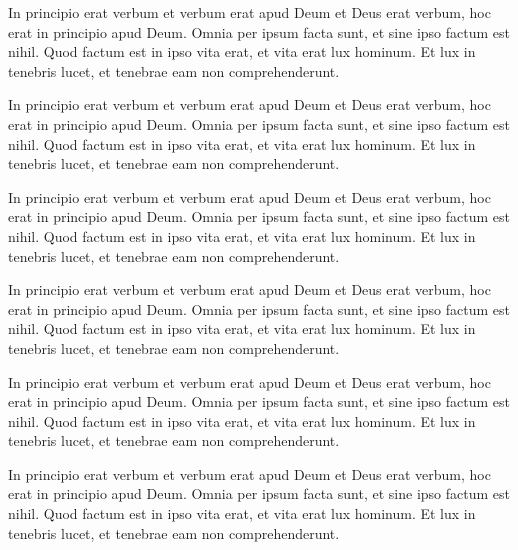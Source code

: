 \documentclass{scrbook}
\begin{document}
\begin{pages}
\begin{Leftside}
\beginnumbering
\pstart
In principio erat verbum et verbum erat apud Deum et Deus erat verbum, hoc erat in principio apud Deum. Omnia per ipsum facta sunt, et sine ipso factum est nihil. Quod factum est in ipso vita erat, et vita erat lux hominum. Et lux in tenebris lucet, et tenebrae eam non comprehenderunt.
\pend

\pstart[\vskip \baselineskip{\hfill ***\hfill\strut}\vskip \baselineskip]
In principio erat verbum et verbum erat apud Deum et Deus erat verbum, hoc erat in principio apud Deum. Omnia per ipsum facta sunt, et sine ipso factum est nihil. Quod factum est in ipso vita erat, et vita erat lux hominum. Et lux in tenebris lucet, et tenebrae eam non comprehenderunt.
\pend

\pstart
In principio erat verbum et verbum erat apud Deum et Deus erat verbum, hoc erat in principio apud Deum. Omnia per ipsum facta sunt, et sine ipso factum est nihil. Quod factum est in ipso vita erat, et vita erat lux hominum. Et lux in tenebris lucet, et tenebrae eam non comprehenderunt.
\pend
\endnumbering
\end{Leftside}
\begin{Rightside}
\beginnumbering
\pstart
In principio erat verbum et verbum erat apud Deum et Deus erat verbum, hoc erat in principio apud Deum. Omnia per ipsum facta sunt, et sine ipso factum est nihil. Quod factum est in ipso vita erat, et vita erat lux hominum. Et lux in tenebris lucet, et tenebrae eam non comprehenderunt.
\pend

\pstart[\vskip \baselineskip{\hfill ***\hfill\strut}\vskip \baselineskip]
In principio erat verbum et verbum erat apud Deum et Deus erat verbum, hoc erat in principio apud Deum. Omnia per ipsum facta sunt, et sine ipso factum est nihil. Quod factum est in ipso vita erat, et vita erat lux hominum. Et lux in tenebris lucet, et tenebrae eam non comprehenderunt.
\pend

\pstart
In principio erat verbum et verbum erat apud Deum et Deus erat verbum, hoc erat in principio apud Deum. Omnia per ipsum facta sunt, et sine ipso factum est nihil. Quod factum est in ipso vita erat, et vita erat lux hominum. Et lux in tenebris lucet, et tenebrae eam non comprehenderunt.
\pend
\endnumbering
\end{Rightside}
\end{pages}

\Pages
\end{document}
